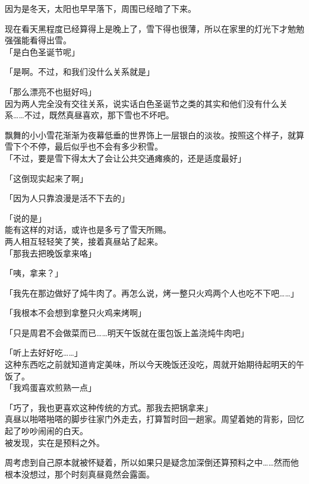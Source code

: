 因为是冬天，太阳也早早落下，周围已经暗了下来。

现在看天黑程度已经算得上是晚上了，雪下得也很薄，所以在家里的灯光下才勉勉强强能看得出雪。\\

「是白色圣诞节呢」

「是啊。不过，和我们没什么关系就是」

「那么漂亮不也挺好吗」\\

因为两人完全没有交往关系，说实话白色圣诞节之类的其实和他们没有什么关系……不过，既然真昼喜欢，那下雪也不坏吧。

飘舞的小小雪花渐渐为夜幕低垂的世界饰上一层银白的淡妆。按照这个样子，就算雪下个不停，最后似乎也不会有多少积雪。\\

「不过，要是雪下得太大了会让公共交通瘫痪的，还是适度最好」

「这倒现实起来了啊」

「因为人只靠浪漫是活不下去的」

「说的是」\\

能有这样的对话，或许也是多亏了雪天所赐。\\

两人相互轻轻笑了笑，接着真昼站了起来。\\

「那我去把晚饭拿来咯」

「咦，拿来？」

「我先在那边做好了炖牛肉了。再怎么说，烤一整只火鸡两个人也吃不下吧……」

「我根本不会想到拿整只火鸡来烤啊」

「只是周君不会做菜而已……明天午饭就在蛋包饭上盖浇炖牛肉吧」

「听上去好好吃……」\\

这种东西吃之前就知道肯定美味，所以今天晚饭还没吃，周就开始期待起明天的午饭了。\\

「我鸡蛋喜欢煎熟一点」

「巧了，我也更喜欢这种传统的方式。那我去把锅拿来」\\

真昼以啪嗒啪嗒的脚步往家门外走去，打算暂时回一趟家。周望着她的背影，回忆起了吵吵闹闹的白天。\\

被发现，实在是预料之外。

周考虑到自己原本就被怀疑着，所以如果只是疑念加深倒还算预料之中……然而他根本没想过，那个时刻真昼竟然会露面。\\

